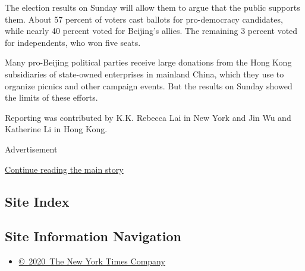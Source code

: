 The election results on Sunday will allow them to argue that the public
supports them. About 57 percent of voters cast ballots for pro-democracy
candidates, while nearly 40 percent voted for Beijing's allies. The
remaining 3 percent voted for independents, who won five seats.

Many pro-Beijing political parties receive large donations from the Hong
Kong subsidiaries of state-owned enterprises in mainland China, which
they use to organize picnics and other campaign events. But the results
on Sunday showed the limits of these efforts.

Reporting was contributed by K.K. Rebecca Lai in New York and Jin Wu and
Katherine Li in Hong Kong.

Advertisement

\protect\hyperlink{after-bottom}{Continue reading the main story}

\hypertarget{site-index}{%
\subsection{Site Index}\label{site-index}}

\hypertarget{site-information-navigation}{%
\subsection{Site Information
Navigation}\label{site-information-navigation}}

\begin{itemize}
\tightlist
\item
  \href{https://help.nytimes3xbfgragh.onion/hc/en-us/articles/115014792127-Copyright-notice}{©~2020~The
  New York Times Company}
\end{itemize}

